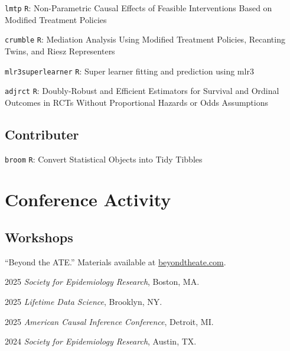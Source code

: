 \documentclass[12pt,letterpaper]{report}
\newcommand{\listitemspace}{0.15em}
\renewenvironment{itemize}
{\begin{list}{}{\setlength{\leftmargin}{0em}
            \setlength{\parskip}{0em}
            \setlength{\itemsep}{\listitemspace}
            \setlength{\parsep}{\listitemspace}}}
    {\end{list}}
\begin{document}
    \begin{tablist}
    
    	\item[{\footnotesize \texttt{lmtp}}] \tab \texttt{R}: Non-Parametric Causal Effects of Feasible Interventions Based on Modified Treatment Policies
	
	    	\item[{\footnotesize \texttt{crumble}}] \tab \texttt{R}: Mediation Analysis Using Modified Treatment Policies, Recanting Twins, and Riesz Representers
		
		\item[{\footnotesize \texttt{mlr3superlearner}}] \tab \texttt{R}: Super learner fitting and prediction using mlr3
		
		\item[{\footnotesize \texttt{adjrct}}] \tab \texttt{R}: Doubly-Robust and Efficient Estimators for Survival and Ordinal Outcomes in RCTs Without Proportional Hazards or Odds Assumptions
    
    \end{tablist}
    
    \subsection*{Contributer}
    
    \begin{tablist}
    
    	\item[{\footnotesize \texttt{broom}}] \tab \texttt{R}: Convert Statistical Objects into Tidy Tibbles
    
    \end{tablist}

    \section*{Conference Activity}
    
    \subsection*{Workshops}
    
     \enquote{Beyond the ATE.} Materials available at \href{https://beyondtheate.com/}{beyondtheate.com}.\\
    
    \begin{itemize}
    
    \item \hspace{1em} 2025 \textit{Society for Epidemiology Research}, Boston, MA. 
    \item \hspace{1em} 2025 \textit{Lifetime Data Science}, Brooklyn, NY. 
    \item \hspace{1em} 2025 \textit{American Causal Inference Conference}, Detroit, MI. 
    \item \hspace{1em} 2024 \textit{Society for Epidemiology Research}, Austin, TX. 
    
    \end{itemize}
\end{document}
